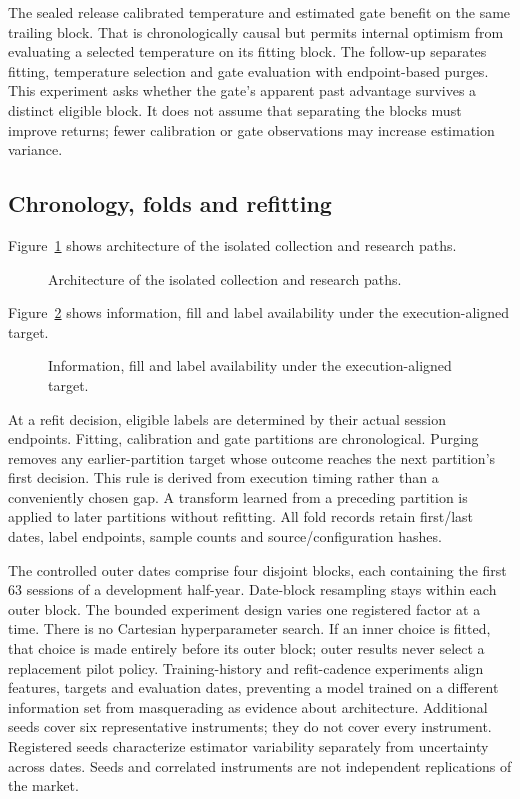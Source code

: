 The sealed release calibrated temperature and estimated gate benefit on the same trailing block. That is chronologically causal but permits internal optimism from evaluating a selected temperature on its fitting block. The follow-up separates fitting, temperature selection and gate evaluation with endpoint-based purges. This experiment asks whether the gate's apparent past advantage survives a distinct eligible block. It does not assume that separating the blocks must improve returns; fewer calibration or gate observations may increase estimation variance.

\subsection{Chronology, folds and refitting}

\noindent Figure~\ref{fig:2} shows architecture of the isolated collection and research paths.

\begin{figure}[htbp]\centering

\caption{Architecture of the isolated collection and research paths.}\label{fig:2}
\end{figure}

\noindent Figure~\ref{fig:3} shows information, fill and label availability under the execution-aligned target.

\begin{figure}[htbp]\centering

\caption{Information, fill and label availability under the execution-aligned target.}\label{fig:3}
\end{figure}

At a refit decision, eligible labels are determined by their actual session endpoints. Fitting, calibration and gate partitions are chronological. Purging removes any earlier-partition target whose outcome reaches the next partition's first decision. This rule is derived from execution timing rather than a conveniently chosen gap. A transform learned from a preceding partition is applied to later partitions without refitting. All fold records retain first/last dates, label endpoints, sample counts and source/configuration hashes.

The controlled outer dates comprise four disjoint blocks, each containing the first 63 sessions of a development half-year. Date-block resampling stays within each outer block. The bounded experiment design varies one registered factor at a time. There is no Cartesian hyperparameter search. If an inner choice is fitted, that choice is made entirely before its outer block; outer results never select a replacement pilot policy. Training-history and refit-cadence experiments align features, targets and evaluation dates, preventing a model trained on a different information set from masquerading as evidence about architecture. Additional seeds cover six representative instruments; they do not cover every instrument. Registered seeds characterize estimator variability separately from uncertainty across dates. Seeds and correlated instruments are not independent replications of the market.

